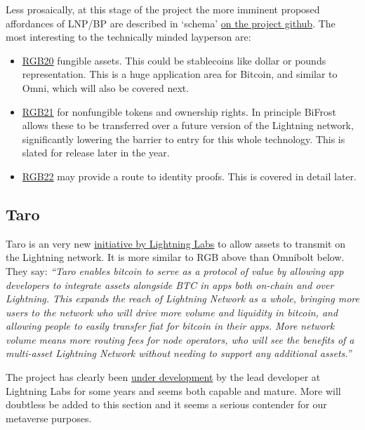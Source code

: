 Less prosaically, at this stage of the project the more imminent proposed affordances of LNP/BP are described in `schema' \href{https://github.com/LNP-BP/LNPBPs}{on the project github}. The most interesting to the technically minded layperson are:
\begin{itemize}
\item \href{https://github.com/LNP-BP/LNPBPs/blob/master/lnpbp-0020.md}{RGB20} fungible assets. This could be stablecoins like dollar or pounds representation. This is a huge application area for Bitcoin, and similar to Omni, which will also be covered next.
\item \href{https://github.com/LNP-BP/LNPBPs/blob/master/lnpbp-0021.md}{RGB21} for nonfungible tokens and ownership rights. In principle BiFrost allows these to be transferred over a future version of the Lightning network, significantly lowering the barrier to entry for this whole technology. This is slated for release later in the year.
\item \href{https://github.com/LNP-BP/LNPBPs/issues/29}{RGB22} may provide a route to identity proofs. This is covered in detail later.
\end{itemize}
\subsection{Taro}
Taro is an very new \href{https://lightning.engineering/posts/2022-4-5-taro-launch/}{initiative by Lightning Labs} to allow assets to transmit on the Lightning network. It is more similar to RGB above than Omnibolt below. They say: \textit{``Taro enables bitcoin to serve as a protocol of value by allowing app developers to integrate assets alongside BTC in apps both on-chain and over Lightning. This expands the reach of Lightning Network as a whole, bringing more users to the network who will drive more volume and liquidity in bitcoin, and allowing people to easily transfer fiat for bitcoin in their apps. More network volume means more routing fees for node operators, who will see the benefits of a multi-asset Lightning Network without needing to support any additional assets.''}\par
The project has clearly been \href{https://github.com/roasbeef/bips/tree/bip-taro}{under development} by the lead developer at Lightning Labs for some years and seems both capable and mature. More will doubtless be added to this section and it seems a serious contender for our metaverse purposes.
